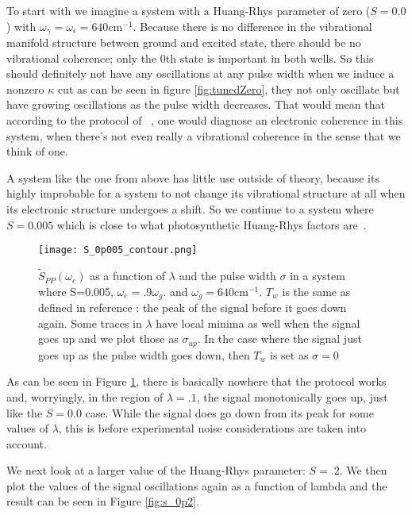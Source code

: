 To start with we imagine a system with a Huang-Rhys parameter of zero  ($S=0.0$) with $\omega_{\gamma} = \omega_{\epsilon}= 640 \text{cm}^{-1}$.  Because there is no difference in the vibrational manifold structure between ground and excited state, there should be no vibrational coherence; only the 0th state is important in both wells.  So this should definitely not have any oscillations at any pulse width when we induce a nonzero $\kappa$ cut as can be seen in figure \ref{fig:tunedZero}, they not only oscillate but have growing oscillations as the pulse width decreases.  That would mean that according to the protocol of ~\cite{witness,allanWitness}, one would diagnose an electronic coherence in this system, when there's not even really a vibrational coherence in the sense that we think of one.

A system like the one from above has little use outside of theory, because its highly improbable for a system to not change its vibrational structure at all when its electronic structure undergoes a shift.  So we continue to a system where $S=0.005$ which is close to what photosynthetic Huang-Rhys factors are~\cite{typicalHRFforPhotosynthesis}.


\begin{figure}
   \texttt{[image: S\_0p005\_contour.png]}
   \caption{$\tilde{S}_{PP} ( \omega_e)$ as a function of $\lambda$ and the pulse width $\sigma$ in a system where S=0.005, $\omega_e = .9 \omega_g$. and $\omega_g = 640 \text{cm}^{-1}$. $T_w$ is the same as defined in reference \cite{allanWitness}: the peak of the signal before it goes down again.   Some traces in $\lambda$ have local minima as well when the signal goes up and we plot those as $\sigma_{up}$.  In the case where the signal just goes up as the pulse width goes down, then $T_w$ is set as $\sigma=0$}
	\label{fig:s_0p005}
\end{figure}

As can be seen in Figure \ref{fig:s_0p005}, there is basically nowhere that the protocol works and, worryingly, in the region of $\lambda = .1$, the signal monotonically goes up, just like the $S=0.0$ case.  While the signal does go down from its peak for some values of $\lambda$, this is before experimental noise considerations are taken into account.

We next look at a larger value of the Huang-Rhys parameter: $S=.2$.  We then plot the values of the signal oscillations again as a function of lambda and the result can be seen in Figure \ref{fig:s_0p2}.

